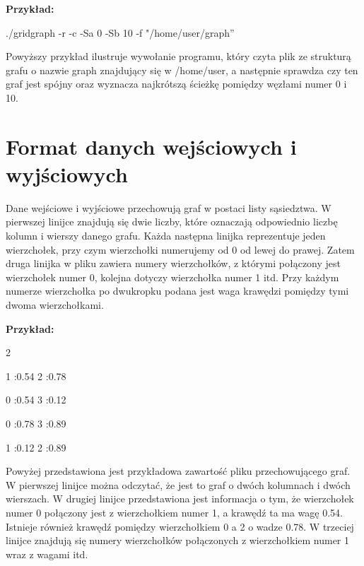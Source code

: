 \documentclass[11pt,a4paper]{report}
\def\console #1{\begingroup\fontfamily{qcr}\selectfont#1\endgroup}
\newenvironment{multiconsole}{\begingroup\fontfamily{qcr}\selectfont}{\endgroup}
\begin{document}
    \textbf{Przykład:}

    \vspace{1em}

    \noindent
    \console{./gridgraph -r -c -Sa 0 -Sb 10 -f "/home/user/graph”}

    \vspace{1em}

    Powyższy przykład ilustruje wywołanie programu, który czyta plik ze strukturą grafu o nazwie \console{graph} znajdujący się w \console{/home/user}, a następnie sprawdza czy ten graf jest spójny oraz wyznacza najkrótszą ścieżkę pomiędzy węzłami numer 0 i 10.



    \newpage
    \section{Format danych wejściowych i wyjściowych}
    Dane wejściowe i wyjściowe przechowują graf w postaci listy sąsiedztwa. W pierwszej linijce znajdują się dwie liczby, które oznaczają odpowiednio liczbę kolumn i wierszy danego grafu. Każda następna linijka reprezentuje jeden wierzchołek, przy czym wierzchołki numerujemy od 0 od lewej do prawej. Zatem druga linijka w pliku zawiera numery wierzchołków, z którymi połączony jest wierzchołek numer 0, kolejna dotyczy wierzchołka numer 1 itd. Przy każdym numerze wierzchołka po dwukropku podana jest waga krawędzi pomiędzy tymi dwoma wierzchołkami.

    \vspace{1em}

    \noindent
    \textbf{Przykład:}

    \begin{multiconsole}
        2 2

        \hspace*{2em}1 :0.54  2 :0.78

        \hspace*{2em}0 :0.54  3 :0.12

        \hspace*{2em}0 :0.78  3 :0.89

        \hspace*{2em}1 :0.12  2 :0.89
    \end{multiconsole}

    Powyżej przedstawiona jest przykładowa zawartość pliku przechowującego graf. W pierwszej linijce można odczytać, że jest to graf o dwóch kolumnach i dwóch wierszach. W drugiej linijce przedstawiona jest informacja o tym, że wierzchołek numer 0 połączony jest z wierzchołkiem numer 1, a krawędź ta ma wagę 0.54. Istnieje również krawędź pomiędzy wierzchołkiem 0 a 2 o wadze 0.78. W trzeciej linijce znajdują się numery wierzchołków połączonych z wierzchołkiem numer 1 wraz z wagami itd.
\end{document}
